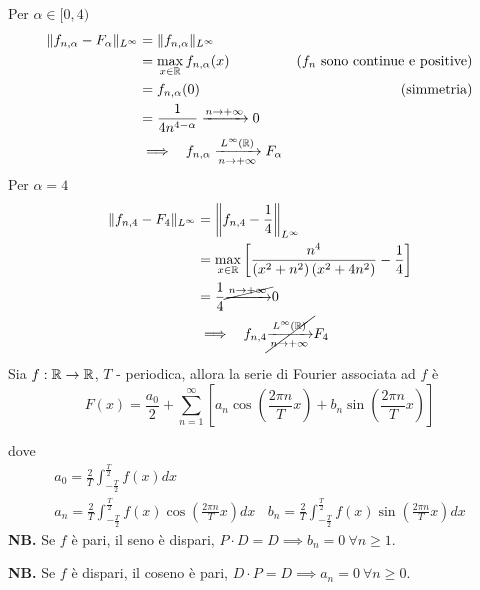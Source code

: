 \begin{enumerate}
Per $\alpha \in [ 0,4)$
\begin{equation*}
\begin{aligned}
\Vert f_{n,\alpha } - F_{\alpha }\Vert _{L^{\infty }} & = \Vert f_{n,\alpha }\Vert _{L^{\infty }} & \\
 & = \max_{x\in \mathbb{R} } f_{n,\alpha }(x) & \left(f_{n} \ \text{sono continue e positive}\right)\\
 & = f_{n,\alpha }(0) & \text{(simmetria)}\\
 & = \frac{1}{4n^{4 - \alpha }}\xrightarrow{n\rightarrow + \infty } 0 & \\
 & \implies \ \ f_{n,\alpha }\xrightarrow[n\rightarrow + \infty ]{L^{\infty }(\mathbb{R})} F_{\alpha } & 
\end{aligned}
\end{equation*}Per $\alpha = 4$
\begin{equation*}
\begin{aligned}
\Vert f_{n,4} - F_{4}\Vert _{L^{\infty }} & = \left\Vert f_{n,4} - \frac{1}{4}\right\Vert _{L^{\infty }}\\
 & = \max_{x\in \mathbb{R} }\left[\frac{n^{4}}{\left(x^{2} + n^{2}\right)\left(x^{2} + 4n^{2}\right)} - \frac{1}{4}\right]\\
 & = \frac{1}{4}\cancel{\xrightarrow{n\rightarrow + \infty }} 0\\
 & \implies \ \ f_{n,4}\cancel{\xrightarrow[n\rightarrow + \infty ]{L^{\infty }(\mathbb{R})}} F_{4}
\end{aligned}
\end{equation*}
\end{enumerate}
\Soluzione
\begin{thm}
Sia $f:\mathbb{R} \rightarrow \mathbb{R} $, $T$ - periodica, allora la serie di Fourier associata ad $f$ è
\begin{equation*}
F(x) = \frac{a_{0}}{2} + \sum\limits ^{\infty }_{n = 1}\left[ a_{n}\cos\left(\frac{2\pi n}{T} x\right) + b_{n}\sin\left(\frac{2\pi n}{T} x\right)\right]
\end{equation*}

dove
\begin{gather*}
a_{0} = \frac{2}{T}\int ^{\frac{T}{2}}_{ - \frac{T}{2}} f(x) dx\\
a_{n} = \frac{2}{T}\int ^{\frac{T}{2}}_{ - \frac{T}{2}} f(x)\cos\left(\frac{2\pi n}{T} x\right) dx\ \ \ \ b_{n} = \frac{2}{T}\int ^{\frac{T}{2}}_{ - \frac{T}{2}} f(x)\sin\left(\frac{2\pi n}{T} x\right) dx
\end{gather*}
\textbf{NB.} Se $f$ è pari, il seno è dispari, $P\cdot D = D\implies b_{n} = 0\ \forall n\geq 1$.

\textbf{NB.} Se $f$ è dispari, il coseno è pari, $D\cdot P = D\implies a_{n} = 0\ \forall n\geq 0$.
\end{thm}
